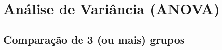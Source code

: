 \documentclass{beamer}
\begin{document}
\section[ANOVA]{Análise de Variância (ANOVA)}

\subsection{Comparação de 3 (ou mais) grupos}







\end{document}
